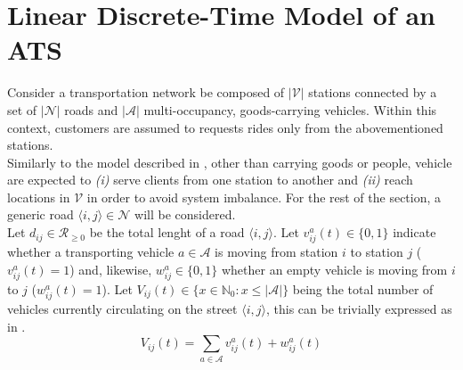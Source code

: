 \section{Linear Discrete-Time Model of an ATS}\label{sec:linear_discrete_time_model}
Consider a transportation network be composed of $|\mathcal{V}|$ stations connected by a set of $|\mathcal{N}|$ roads and $|\mathcal{A}|$ multi-occupancy, goods-carrying vehicles. Within this context, customers are assumed to requests rides only from the abovementioned stations.\\ %
Similarly to the model described in , other than carrying goods or people, vehicle are expected to \textit{(i)} serve clients from one station to another and \textit{(ii)} reach locations in $\mathcal{V}$ in order to avoid system imbalance. For the rest of the section, a generic road $\langle i,j\rangle \in \mathcal{N}$ will be considered.\\
Let $d_{ij} \in \mathcal{R}_{\ge0}$ be the total lenght of a road $\langle i,j\rangle$. Let $v^a_{ij}(t) \in \{0,1\}$ indicate whether a transporting vehicle $a \in \mathcal{A}$ is moving from station $i$ to station $j$ ($v^a_{ij}(t) = 1$) and, likewise, $w^{a}_{ij}\in \{0,1\} $ whether an empty vehicle is moving from $i$ to $j$ ($w^{a}_{ij}(t)= 1$). Let $V_{ij}(t) \in \{ x \in \mathbb{N}_0 : x \leq |\mathcal{A}|\}$ being the total number of vehicles currently circulating on the street $\langle i,j\rangle$, this can be trivially expressed as in . \\

\begin{equation}
	V_{ij}(t) = \sum_{a \in \mathcal{A}} v^{a}_{ij}(t) +w^{a}_{ij}(t)
	\label{eq:vehicles_on_street}
\end{equation}

